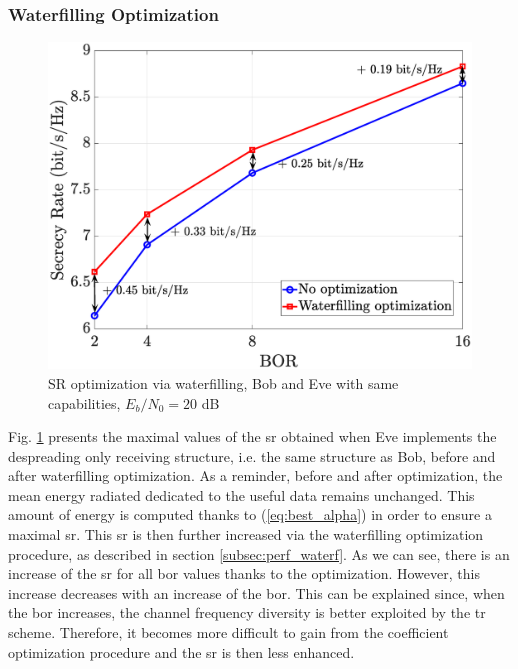 \subsubsection{Waterfilling Optimization}
\label{subsub:simu_waterfilling}
\begin{figure}[htb!]
    \centering
    \centerline{\includegraphics[width = .65\textwidth]{graphs/alpha_waterfilling.eps}}
    \caption{SR optimization via waterfilling, Bob and Eve with same capabilities, $E_b/N_0=20$ dB}
    \label{fig:waterfilling_opt_alpha}
\end{figure} 
Fig. \ref{fig:waterfilling_opt_alpha} presents the maximal values of the \gls{sr} obtained when Eve implements the despreading only receiving structure, i.e. the same structure as Bob, before and after waterfilling optimization. As a reminder, before and after optimization, the mean energy radiated dedicated to the useful data remains unchanged. This amount of energy is computed thanks to (\ref{eq:best_alpha}) in order to ensure a maximal \gls{sr}. This \gls{sr} is then further increased via the waterfilling optimization procedure, as described in section \ref{subsec:perf_waterf}. As we can see, there is an increase of the \gls{sr} for all \gls{bor} values thanks to the optimization. However, this increase decreases with an increase of the \gls{bor}. This can be explained since, when the \gls{bor} increases, the channel frequency diversity is better exploited by the \gls{tr} scheme. Therefore, it becomes more difficult to gain from the coefficient optimization procedure and the \gls{sr} is then less enhanced. 